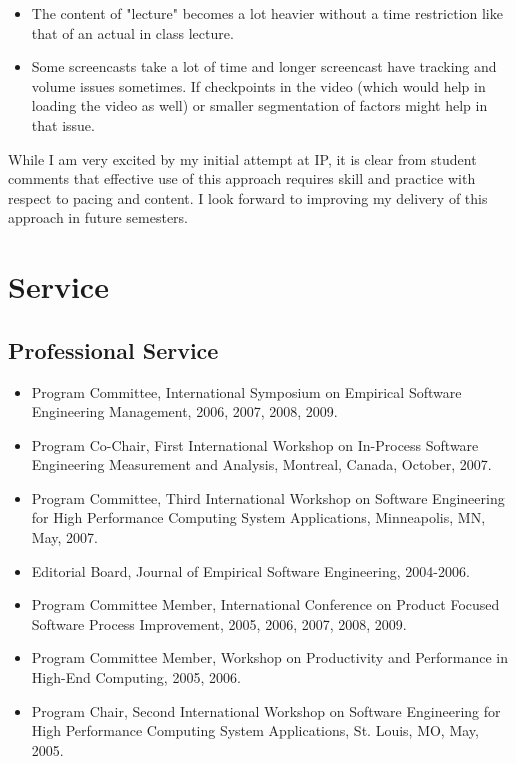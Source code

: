 \documentclass[11pt]{article}
\begin{document}
\begin{itemize}
\item The content of "lecture" becomes a lot heavier without a time
  restriction like that of an actual in class lecture.

\item Some screencasts take a lot of time and longer screencast have
  tracking and volume issues sometimes. If checkpoints in the video (which
  would help in loading the video as well) or smaller segmentation of
  factors might help in that issue.

\end{itemize}

While I am very excited by my initial attempt at IP, it is clear from
student comments that effective use of this approach requires skill and
practice with respect to pacing and content.  I look forward to improving
my delivery of this approach in future semesters. 

\section{Service}

\subsection{Professional Service}

\begin{itemize}

\item Program Committee, International Symposium on Empirical Software
  Engineering Management,  2006, 2007, 2008, 2009.

\item Program Co-Chair, First International Workshop on In-Process Software Engineering Measurement 
and Analysis, Montreal, Canada, October, 2007. 

\item Program Committee, Third International Workshop on Software Engineering for High Performance 
Computing System Applications, Minneapolis, MN, May, 2007. 

\item Editorial Board, Journal of Empirical Software Engineering, 2004-2006.

\item Program Committee Member, International Conference on Product Focused
  Software Process Improvement,  2005, 2006, 2007, 2008, 2009.

\item Program Committee Member, Workshop on Productivity and Performance in High-End Computing, 
2005, 2006. 

\item Program Chair, Second International Workshop on Software Engineering for High Performance 
Computing System Applications, St. Louis, MO, May, 2005. 

\end{itemize}
\end{document}
